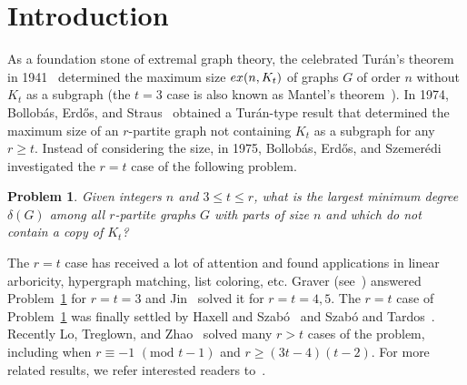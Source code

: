 \documentclass[11pt]{article}
\newtheorem{problem}[theorem]{Problem}
\newcommand{\ex}{{\rm ex}}
\numberwithin{equation}{section}
\begin{document}
	\section{Introduction}
	As a foundation stone of extremal graph theory, the celebrated Tur\'{a}n's theorem in 1941~\cite{turan1941external} determined the maximum size $\ex(n,K_t)$ of graphs $G$ of order $n$ without $K_t$ as a subgraph (the $t=3$ case is also known as Mantel's theorem~\cite{mantel1907opgaven28}). In 1974, Bollob\'{a}s, Erd\H{o}s, and Straus~\cite{bollobas1974complete} obtained a Tur\'{a}n-type result that determined the maximum size of an $r$-partite graph  not containing $K_t$ as a subgraph for any $r\ge t$. Instead of considering the size, in 1975, Bollob\'{a}s, Erd\H{o}s, and Szemer\'{e}di~\cite{bollobas1975complete} investigated the $r=t$ case of the following problem.
	\begin{problem}\label{problem1}
		Given integers $n$ and $3 \leq t \leq r$, what is the largest minimum degree $\delta(G)$ among all $r$-partite graphs $G$ with parts of size $n$ and which do not contain a copy of $K_t$?
	\end{problem}
	The $r=t$ case has received a lot of attention and found applications in linear arboricity, hypergraph matching, list coloring, etc. Graver (see~\cite{bollobas1975complete}) answered Problem~\ref{problem1} for $r=t=3$ and Jin~\cite{jin1992complete} solved it for $r=t=4, 5$. 
	The $r=t$ case of Problem~\ref{problem1} was finally settled by Haxell and Szab\'{o}~\cite{haxell2006odd} and Szab\'{o} and Tardos~\cite{szabo2006extremal}. Recently Lo, Treglown, and Zhao~\cite{lo2022complete} solved many $r > t$ cases of the problem, including when $r \equiv -1$ $(\text{mod } t - 1)$ and $r\ge (3t-4)(t-2)$. For more related results, we refer interested readers to~\cite{alon1988linear, haxell2001note, haxell2006odd, jin1992complete, szabo2006extremal}.
	
	\vskip 0.1in
	
\end{document}
